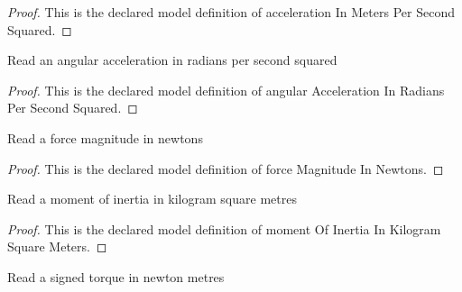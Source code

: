 \begin{proof}
  This is the declared model definition of acceleration In Meters Per Second Squared.
\end{proof}
\begin{definition}
  \label{def:physics:phyx-mini-0784:phyxminiproblems-problemphyxmini0784-angularaccelerationinradianspersecondsquared}
  Read an angular acceleration in radians per second squared
\end{definition}
\begin{proof}
  This is the declared model definition of angular Acceleration In Radians Per Second Squared.
\end{proof}
\begin{definition}
  \label{def:physics:phyx-mini-0784:phyxminiproblems-problemphyxmini0784-forcemagnitudeinnewtons}
  Read a force magnitude in newtons
\end{definition}
\begin{proof}
  This is the declared model definition of force Magnitude In Newtons.
\end{proof}
\begin{definition}
  \label{def:physics:phyx-mini-0784:phyxminiproblems-problemphyxmini0784-momentofinertiainkilogramsquaremeters}
  Read a moment of inertia in kilogram square metres
\end{definition}
\begin{proof}
  This is the declared model definition of moment Of Inertia In Kilogram Square Meters.
\end{proof}
\begin{definition}
  \label{def:physics:phyx-mini-0784:phyxminiproblems-problemphyxmini0784-signedtorqueinnewtonmeters}
  Read a signed torque in newton metres
\end{definition}
